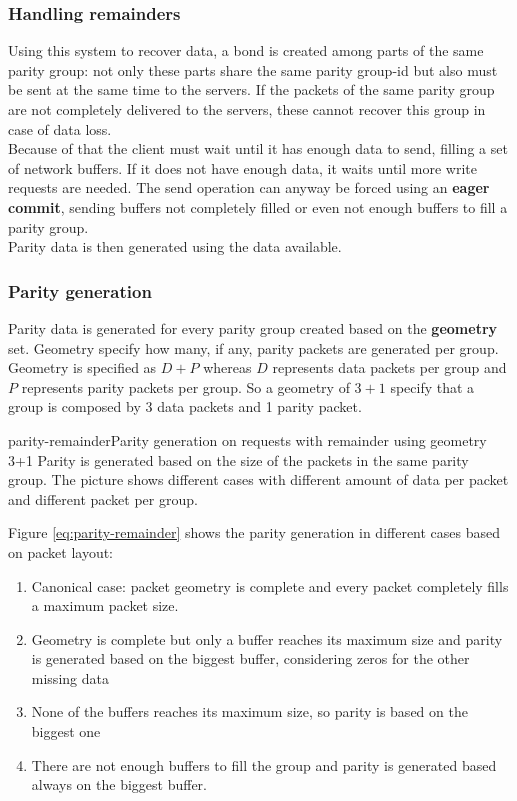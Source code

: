 \subsubsection*{Handling remainders}
Using this system to recover data, a bond is created among parts of the same parity group:
not only these parts share the same parity group-id but also must be sent at the
same time to the servers. If the packets of the same parity group are not
completely delivered to the servers, these cannot recover this group in case of
data loss. \\
Because of that the client must wait until it has enough data to send, filling a set of network buffers. If it does not have
enough data, it waits until more write requests are needed. The send operation can anyway be forced using an
\textbf{eager commit}, sending buffers not completely filled or even not enough buffers to fill a parity group. \\
Parity data is then generated using the data available. \\

\subsubsection*{Parity generation}\label{parity}
Parity data is generated for every parity group created based on the
\textbf{geometry} set. Geometry specify how many, if any, parity packets are
generated per group. Geometry is specified as $D + P$ whereas $D$ represents
data packets per group and $P$ represents parity packets per group. So a
geometry of $3+1$ specify that a group is composed by 3 data packets and 1
parity packet.
\begin{myimage}{parity-remainder}{Parity generation on requests with remainder
    using geometry 3+1}
    Parity is generated based on the size of the packets in the same parity
    group. The picture shows different cases with different amount of data per
    packet and different packet per group.
\end{myimage}
Figure \ref{eq:parity-remainder} shows the parity generation in different cases
based on packet layout:
\begin{enumerate}
    \item Canonical case: packet geometry is complete and every packet
        completely fills a maximum packet size.
    \item Geometry is complete but only a buffer reaches its maximum size and
        parity is generated based on the biggest buffer, considering zeros for
        the other missing data
    \item None of the buffers reaches its maximum size, so parity is based on the biggest one
    \item There are not enough buffers to fill the group and parity is generated based always
        on the biggest buffer.
\end{enumerate}

